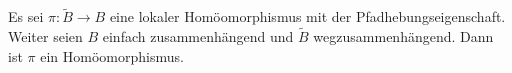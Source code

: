 Es sei $\pi\colon \widetilde{B}\to B$ eine lokaler Homöomorphismus \pause mit der Pfadhebungseigenschaft. \pause Weiter seien $B$ einfach zusammenhängend \pause und $\widetilde{B}$ wegzusammenhängend. \pause Dann ist $\pi$ ein Homöomorphismus.